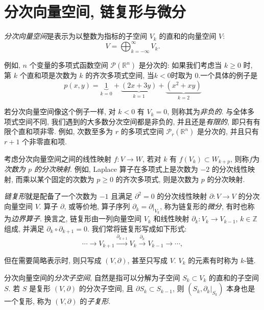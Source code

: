 \section{分次向量空间, 链复形与微分}\label{sec:graded-chain-complexes}

\emph{分次向量空间}是表示为以整数为指标的子空间 $V_k$ 的直和的向量空间 $V$:
\[
V=\bigoplus_{k=-\infty}^{\infty}V_k.
\]

例如, $n$ 个变量的多项式函数空间 $\mathcal P(\mathbb R^n)$ 是分次的: 如果我们考虑当 $k\geq0$ 时, 第 $k$ 个直和项是次数为 $k$ 的齐次多项式空间, 当$k<0$时取为 $0$.一个具体的例子是
$$
p(x,y)=\underbrace{1}_{k=0}+\underbrace{(2x+3y)}_{k=1}+\underbrace{(x^2+xy)}_{k=2}
$$

若分次向量空间像这个例子一样, 对 $k<0$ 有 $V_k=0$, 则称其为\emph{非负的}. 与全体多项式空间不同, 我们遇到的大多数分次空间都是非负的, 并且还是\emph{有限的}, 即只有有限个直和项非零. 例如, 次数至多为 $r$ 的多项式空间 $\mathcal P_r(\mathbb R^n)$ 是分次的, 并且只有 $r+1$ 个非零直和项.

考虑分次向量空间之间的线性映射 $f:V\to W$, 若对 $k$ 有 $f(V_k)\subset W_{k+p}$, 则称$f$为\emph{次数为 $p$ 的分次映射}. 例如, Laplace 算子在多项式上是次数为 $-2$ 的分次线性映射, 而乘以某个固定的次数为 $p\geq0$ 的齐次多项式, 则是次数为 $p$ 的分次映射.

\emph{链复形}就是配备了一个次数为 $-1$ 且满足 $\partial^2=0$ 的分次线性映射 $\partial:V\to V$ 的分次向量空间 $V$. 算子 $\partial$, 或等价地, 算子序列 $\partial_k=\partial|_{V_k}$, 称为链复形的\emph{微分}, 有时也称为\emph{边界算子}. 换言之, 链复形由一列向量空间 $V_k$ 和线性映射 $\partial_k:V_k\to V_{k-1}$, $k\in\mathbb Z$ 组成, 并满足 $\partial_k\circ\partial_{k+1}=0$. 我们常将链复形写成如下形式:
\[
\cdots\to V_{k+1}\xrightarrow{\partial_{k+1}}V_k\xrightarrow{\partial_k}V_{k-1}\to\cdots,
\]

但在需要简略表示时, 则只写成 $(V,\partial)$, 甚至只写成 $V$. $V_k$ 的元素有时称为 $k$-链.

分次向量空间的\emph{分次子空间}, 自然是指可以分解为子空间 $S_k\subset V_k$ 的直和的子空间 $S$. 若 $S$ 是复形 $(V,\partial)$ 的分次子空间, 且 $\partial S_k\subset S_{k-1}$, 则 $(S_k,\partial_k|_{S_k})$ 本身也是一个复形, 称为 $(V,\partial)$ 的\emph{子复形}.
